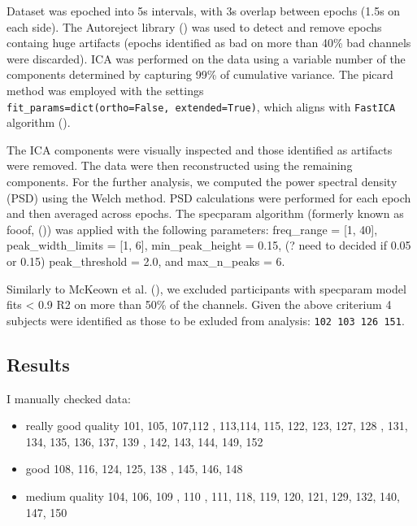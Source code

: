 \documentclass[
  letterpaper,
  DIV=11,
  numbers=noendperiod]{scrartcl}
\begin{document}
Dataset was epoched into 5s intervals, with 3s overlap between epochs
(1.5s on each side). The Autoreject library
() was
used to detect and remove epochs containg huge artifacts (epochs
identified as bad on more than 40\% bad channels were discarded). ICA
was performed on the data using a variable number of the components
determined by capturing 99\% of cumulative variance. The picard method
was employed with the settings
\texttt{fit\_params=dict(ortho=False,\ extended=True)}, which aligns
with \texttt{FastICA} algorithm
().

The ICA components were visually inspected and those identified as
artifacts were removed. The data were then reconstructed using the
remaining components. For the further analysis, we computed the power
spectral density (PSD) using the Welch method. PSD calculations were
performed for each epoch and then averaged across epochs. The specparam
algorithm (formerly known as fooof,
()) was applied with the following parameters: freq\_range = {[}1,
40{]}, peak\_width\_limits = {[}1, 6{]}, min\_peak\_height = 0.15, (?
need to decided if 0.05 or 0.15) peak\_threshold = 2.0, and
max\_n\_peaks = 6.

Similarly to McKeown et al.
(), we
excluded participants with specparam model fits \textless{} 0.9 R2 on
more than 50\% of the channels. Given the above criterium 4 subjects
were identified as those to be exluded from analysis:
\texttt{102\ 103\ 126\ 151}.

\subsection{Results}\label{results}

I manually checked data:

\begin{itemize}
\item
  really good quality 101, 105, 107,112 , 113,114, 115, 122, 123, 127,
  128 , 131, 134, 135, 136, 137, 139 , 142, 143, 144, 149, 152
\item
  good 108, 116, 124, 125, 138 , 145, 146, 148
\item
  medium quality 104, 106, 109 , 110 , 111, 118, 119, 120, 121, 129,
  132, 140, 147, 150
\end{itemize}
\end{document}
